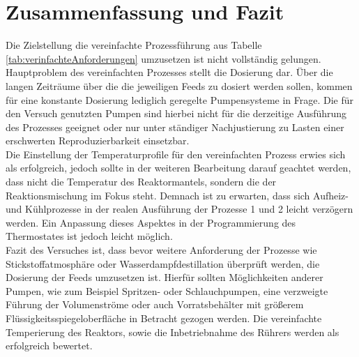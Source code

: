 \section{Zusammenfassung und Fazit}
\label{sec:zusammenfassung}
Die Zielstellung die vereinfachte Prozessführung aus Tabelle \ref{tab:verinfachteAnforderungen} umzusetzen ist nicht vollständig gelungen. Hauptproblem des vereinfachten Prozesses stellt die Dosierung dar. Über die langen Zeiträume über die die jeweiligen Feeds zu dosiert werden sollen, kommen für eine konstante Dosierung lediglich geregelte Pumpensysteme in Frage. Die für den Versuch genutzten Pumpen sind hierbei nicht für die derzeitige Ausführung des Prozesses geeignet oder nur unter ständiger Nachjustierung zu Lasten einer erschwerten Reproduzierbarkeit einsetzbar.\\
Die Einstellung der Temperaturprofile für den vereinfachten Prozess erwies sich als erfolgreich, jedoch sollte in der weiteren Bearbeitung darauf geachtet werden, dass nicht die Temperatur des Reaktormantels, sondern die der Reaktionsmischung im Fokus steht. Demnach ist zu erwarten, dass sich Aufheiz- und Kühlprozesse in der realen Ausführung der Prozesse 1 und 2 leicht verzögern werden. Ein Anpassung dieses Aspektes in der Programmierung des Thermostates ist jedoch leicht möglich.\\

Fazit des Versuches ist, dass bevor weitere Anforderung der Prozesse wie Stickstoffatmosphäre oder Wasserdampfdestillation überprüft werden, die Dosierung der Feeds umzusetzen ist. Hierfür sollten Möglichkeiten anderer Pumpen, wie zum Beispiel Spritzen- oder Schlauchpumpen, eine verzweigte Führung der Volumenströme oder auch Vorratsbehälter mit größerem Flüssigkeitsspiegeloberfläche in Betracht gezogen werden. Die vereinfachte Temperierung des Reaktors, sowie die Inbetriebnahme des Rührers werden als erfolgreich bewertet.
